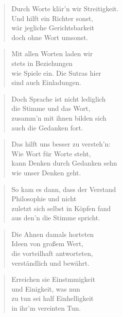 \documentclass[10pt,a4paper]{article}
\begin{document}
\begin{paracol}{2}
\begin{verse}
Durch Worte klär’n wir Streitigkeit. \\
Und hilft ein Richter sonst, \\
wär jegliche Gerichtsbarkeit \\
doch ohne Wort umsonst. \\
\end{verse}

\begin{verse}
Mit allen Worten laden wir \\
stets in Beziehungen \\
wie Spiele ein. Die Sutras hier \\
sind auch Einladungen. \\
\end{verse}

\begin{verse}
Doch Sprache ist nicht lediglich \\
die Stimme und das Wort, \\
zusamm’n mit ihnen bilden sich \\
auch die Gedanken fort. \\
\end{verse}

\begin{verse}
Das hilft uns besser zu versteh’n: \\
Wie Wort für Worte steht, \\
kann Denken durch Gedanken sehn \\
wie unser Denken geht. \\
\end{verse}

\begin{verse}
So kam es dann, dass der Verstand \\
Philosophie und nicht \\
zuletzt sich selbst in Köpfen fand \\
aus den’n die Stimme spricht. \\
\end{verse}

\begin{verse}
Die Ahnen damals horteten \\
Ideen von großem Wert, \\
die vorteilhaft antworteten, \\
verständlich und bewährt. \\
\end{verse}

\begin{verse}
Erreichen sie Einstmmigkeit \\
und Einigkeit, was nun \\
zu tun sei half Einhelligkeit \\
in ihr’m vereinten Tun. \\
\end{verse}


\end{paracol}
\end{document}
